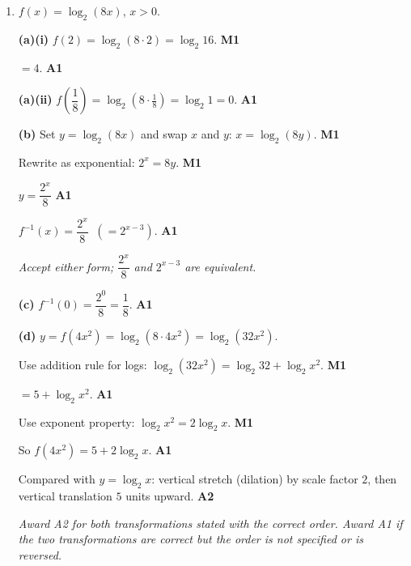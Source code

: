 \documentclass[12pt, twoside]{article}
\begin{document}
\begin{enumerate}[itemsep=0.3cm]
\emph{Power rule and quotient rule may be applied in any order; this M1
rewards either rewriting toward a single logarithm with the same base.}

Equate arguments: $10\sqrt{x} = 2$, \;so\; $\sqrt{x} = \dfrac{1}{5}$.
\hfill \textbf{A1}

$x = \dfrac{1}{25}$. \hfill \textbf{A1}

\newpage

\item[6.] [Maximum mark: 14]

$f(x) = \log_{2}(8x)$, \;$x > 0$.

\medskip

\textbf{(a)(i)} $f(2) = \log_{2}(8 \cdot 2) = \log_{2} 16$. \hfill \textbf{M1}

$= 4$. \hfill \textbf{A1}

\medskip

\textbf{(a)(ii)} $f\!\left(\dfrac{1}{8}\right)
= \log_{2}\!\left(8 \cdot \tfrac{1}{8}\right) = \log_{2} 1 = 0$.
\hfill \textbf{A1}

\medskip

\textbf{(b)} Set $y = \log_{2}(8x)$ and swap $x$ and $y$:
$x = \log_{2}(8y)$. \hfill \textbf{M1}

Rewrite as exponential:
$2^{x} = 8y$. \hfill \textbf{M1}

$y = \dfrac{2^{x}}{8}$ \hfill \textbf{A1}

$f^{-1}(x) = \dfrac{2^{x}}{8} \;\;\left( = 2^{x-3} \right)$.
\hfill \textbf{A1}

\emph{Accept either form; $\dfrac{2^{x}}{8}$ and $2^{x-3}$ are
equivalent.}

\medskip

\textbf{(c)} $f^{-1}(0) = \dfrac{2^{0}}{8} = \dfrac{1}{8}$.
\hfill \textbf{A1}

\medskip

\textbf{(d)} $y = f(4x^{2}) = \log_{2}(8 \cdot 4x^{2}) = \log_{2}(32x^{2})$.

Use addition rule for logs:
$\log_{2}(32x^{2}) = \log_{2} 32 + \log_{2} x^{2}$. \hfill \textbf{M1}

$= 5 + \log_{2} x^{2}$. \hfill \textbf{A1}

Use exponent property: $\log_{2} x^{2} = 2\log_{2} x$. \hfill \textbf{M1}

So $f(4x^{2}) = 5 + 2\log_{2} x$. \hfill \textbf{A1}

Compared with $y = \log_{2} x$: vertical stretch (dilation) by scale
factor $2$, then vertical translation $5$ units upward. \hfill \textbf{A2}

\emph{Award A2 for both transformations stated with the correct order.
Award A1 if the two transformations are correct but the order is not
specified or is reversed.}

\end{enumerate}
\end{document}
